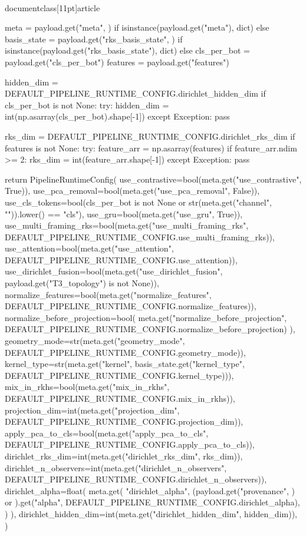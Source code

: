 \\documentclass[11pt]{article}
\begin{document}
\begin{CodeBlock}
    meta = payload.get("meta", {}) if isinstance(payload.get("meta"), dict) else {}
    basis_state = payload.get("rks_basis_state", {}) if isinstance(payload.get("rks_basis_state"), dict) else {}
    cls_per_bot = payload.get("cls_per_bot")
    features = payload.get("features")

    hidden_dim = DEFAULT_PIPELINE_RUNTIME_CONFIG.dirichlet_hidden_dim
    if cls_per_bot is not None:
        try:
            hidden_dim = int(np.asarray(cls_per_bot).shape[-1])
        except Exception:
            pass

    rks_dim = DEFAULT_PIPELINE_RUNTIME_CONFIG.dirichlet_rks_dim
    if features is not None:
        try:
            feature_arr = np.asarray(features)
            if feature_arr.ndim >= 2:
                rks_dim = int(feature_arr.shape[-1])
        except Exception:
            pass

    return PipelineRuntimeConfig(
        use_contrastive=bool(meta.get("use_contrastive", True)),
        use_pca_removal=bool(meta.get("use_pca_removal", False)),
        use_cls_tokens=bool(cls_per_bot is not None or str(meta.get("channel", "")).lower() == "cls"),
        use_gru=bool(meta.get("use_gru", True)),
        use_multi_framing_rks=bool(meta.get("use_multi_framing_rks", DEFAULT_PIPELINE_RUNTIME_CONFIG.use_multi_framing_rks)),
        use_attention=bool(meta.get("use_attention", DEFAULT_PIPELINE_RUNTIME_CONFIG.use_attention)),
        use_dirichlet_fusion=bool(meta.get("use_dirichlet_fusion", payload.get("T3_topology") is not None)),
        normalize_features=bool(meta.get("normalize_features", DEFAULT_PIPELINE_RUNTIME_CONFIG.normalize_features)),
        normalize_before_projection=bool(
            meta.get("normalize_before_projection", DEFAULT_PIPELINE_RUNTIME_CONFIG.normalize_before_projection)
        ),
        geometry_mode=str(meta.get("geometry_mode", DEFAULT_PIPELINE_RUNTIME_CONFIG.geometry_mode)),
        kernel_type=str(meta.get("kernel", basis_state.get("kernel_type", DEFAULT_PIPELINE_RUNTIME_CONFIG.kernel_type))),
        mix_in_rkhs=bool(meta.get("mix_in_rkhs", DEFAULT_PIPELINE_RUNTIME_CONFIG.mix_in_rkhs)),
        projection_dim=int(meta.get("projection_dim", DEFAULT_PIPELINE_RUNTIME_CONFIG.projection_dim)),
        apply_pca_to_cls=bool(meta.get("apply_pca_to_cls", DEFAULT_PIPELINE_RUNTIME_CONFIG.apply_pca_to_cls)),
        dirichlet_rks_dim=int(meta.get("dirichlet_rks_dim", rks_dim)),
        dirichlet_n_observers=int(meta.get("dirichlet_n_observers", DEFAULT_PIPELINE_RUNTIME_CONFIG.dirichlet_n_observers)),
        dirichlet_alpha=float(
            meta.get(
                "dirichlet_alpha",
                (payload.get("provenance", {}) or {}).get("alpha", DEFAULT_PIPELINE_RUNTIME_CONFIG.dirichlet_alpha),
            )
        ),
        dirichlet_hidden_dim=int(meta.get("dirichlet_hidden_dim", hidden_dim)),
    )



\end{CodeBlock}
\end{document}
